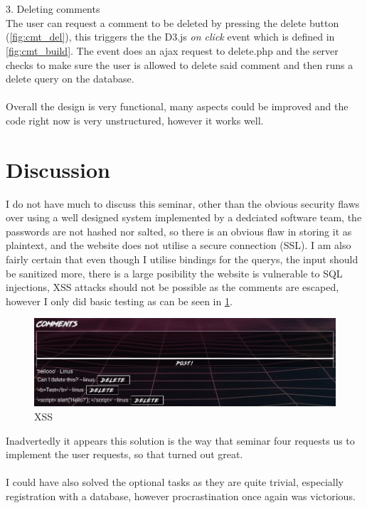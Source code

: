 \documentclass[a4paper]{scrartcl}
\begin{document}
\\\\
3. Deleting comments\\
  The user can request a comment to be deleted by pressing the delete button (\ref{fig:cmt_del}),
  this triggers the the D3.js \textit{on click} event which is defined in \ref{fig:cmt_build}.
  The event does an ajax request to delete.php and the server checks to make sure the user is allowed to delete
  said comment and then runs a delete query on the database.
\\\\
Overall the design is very functional, many aspects could be improved and the code right now
is very unstructured, however it works well.
\section{Discussion}

I do not have much to discuss this seminar, other than the obvious security flaws over 
using a well designed system implemented by a dedciated software team, the passwords
are not hashed nor salted, so there is an obvious flaw in storing it as plaintext,
and the website does not utilise a secure connection (SSL). I am also fairly certain
that even though I utilise bindings for the querys, the input should be sanitized more,
there is a large posibility the website is vulnerable to SQL injections, XSS
attacks should not be possible as the comments are escaped, however I only did
basic testing as can be seen in \ref{fig:xss}.
\\
\begin{figure}[H]
  \begin{center}
    \includegraphics[scale=0.6]{images/xss.png}
    \caption{XSS}
    \label{fig:xss}
  \end{center}
\end{figure}
\noindent
Inadvertedly it appears this solution is the way that seminar four requests us to
implement the user requests, so that turned out great.
\\\\
I could have also solved the optional tasks as they are quite trivial, especially
registration with a database, however procrastination once again was victorious.
\end{document}
